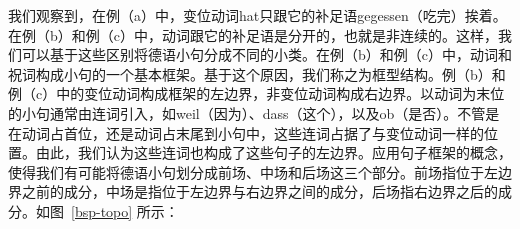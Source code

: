 我们观察到，在例（a）中，变位动词hat只跟它的补足语gegessen（吃完）挨着。在例（b）和例（c）中，动词跟它的补足语是分开的，也就是非连续的。这样，我们可以基于这些区别将德语小句分成不同的小类。在例（b）和例（c）中，动词和祝词构成小句的一个基本框架。基于这个原因，我们称之为框型结构。例（b）和例（c）中的变位动词构成框架的左边界，非变位动词构成右边界。以动词为末位的小句通常由连词引入，如weil（因为）、dass（这个），以及ob（是否）。不管是在动词占首位，还是动词占末尾到小句中，这些连词占据了与变位动词一样的位置。由此，我们认为这些连词也构成了这些句子的左边界。应用句子框架的概念，使得我们有可能将德语小句划分成前场、中场和后场这三个部分。前场指位于左边界之前的成分，中场是指位于左边界与右边界之间的成分，后场指右边界之后的成分。如图~\vref{bsp-topo} 所示：
%
{}%
%
%
%
%
